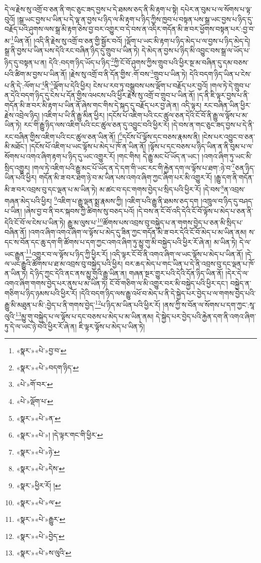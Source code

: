 དེ་ལ་རྗེས་སུ་འགྲོ་བ་ཅན་ནི་གང་ཅུང་ཟད་བྱས་པ་དེ་ཐམས་ཅད་ནི་མི་རྟག་པ་སྟེ། དཔེར་ན་བུམ་པ་ལ་སོགས་པ་ལྟ་བུའོ། །སྒྲ་ཡང་བྱས་པ་ཡིན་པ་དེ་ལྟ་ན་བྱས་པ་ཉིད་ལ་མི་རྟག་པ་ཉིད་ཀྱིས་ཁྱབ་པ་བསྟན་པས་སྒྲ་ཡང་བྱས་པ་ཉིད་དུ་བརྗོད་པའི་ཤུགས་ལས་སྒྲ་མི་རྟག་ཅེས་བྱ་བར་འགྱུར་བ་དེ་བས་ན་འདིར་གདོན་མི་ཟ་བར་ཕྱོགས་བསྟན་པར་:བྱ་བ་མ་\footnote{«སྣར་»«པེ་»བྱ་བ་}ཡིན་ནོ། །འདི་ནི་རྗེས་སུ་འགྲོ་བ་ཅན་གྱི་སྦྱོར་བའོ། །ལྡོག་པ་ཡང་མི་རྟག་པ་ཉིད་མེད་པ་ལ་བྱས་པ་ཉིད་མེད་དེ། སྒྲ་ནི་བྱས་པ་ཡིན་པས་དེའི་རང་བཞིན་ཉིད་དུ་གྲུབ་པ་ཡིན་ཏེ། དེ་མེད་ན་བྱས་པ་ཉིད་མི་འབྱུང་བས་སྒྲ་ལ་ཡོད་པ་ཉིད་དུ་བསྟན་པ་ན། དེའི་:བདག་ཉིད་ཡོད་པ་ཉིད་\footnote{«སྣར་»«པེ་»བདག་ཉིད་}ཀྱི་ངོ་བོ་ཤུགས་ཀྱིས་གྲུབ་པའི་ཕྱིར་སྔ་མ་བཞིན་དུ་དམ་བཅས་པའི་ཚིག་མ་བྱས་པ་ཡིན་ནོ། །རྗེས་སུ་འགྲོ་བ་ནི་དོན་གྱིས་:གོ་བས་\footnote{«པེ་»གོ་བར་}གྲུབ་པ་ཡིན་ཏེ། དེའི་བདག་ཉིད་ཡིན་པ་ངེས་པ་ནི་དེ་:ལོག་པ་\footnote{«པེ་»ལྡོག་པ་}ནི་\footnote{«སྣར་»«པེ་»ན་}ལྡོག་པ་དེའི་ཕྱིར། ངེས་པ་རབ་ཏུ་བསྒྲུབས་པས་ལྡོག་པ་བརྗོད་པར་བྱའོ། །གལ་ཏེ་དེ་གྲུབ་པ་ན་དེའི་བདག་ཉིད་དུ་ངེས་པ་དོན་གྱིས་འཕངས་པའི་ཕྱིར་རྗེས་སུ་འགྲོ་བ་གྲུབ་པ་ཡིན་ནོ། །ད་ནི་ཇི་ལྟར་བྱས་པ་ནི་གདོན་མི་ཟ་བར་མི་རྟག་པ་ཡིན་ནོ་ཞེས་གང་གིས་དེ་སྐད་དུ་བརྗོད་པར་བྱ་ཞེ་ན། འདི་ལྟར། རང་བཞིན་ཡིན་ཕྱིར་རྗེས་འབྲེལ་ཉིད། །འཇིག་པ་ཡི་ནི་རྒྱུ་མིན་ཕྱིར། །དངོས་པོ་འཇིག་པའི་ངང་ཚུལ་ཅན་དེའི་ངོ་བོ་ནི་རྒྱུ་ལ་ལྟོས་པ་མ་ཡིན་ཏེ། རང་གི་རྒྱུ་ཉིད་ལས་འཇིག་པའི་ངང་ཚུལ་ཅན་དུ་འབྱུང་བའི་ཕྱིར་རོ། །དེ་བས་ན་གང་ཅུང་ཟད་བྱས་པ་དེ་ནི་རང་བཞིན་གྱིས་འཇིག་པའི་ངང་ཚུལ་ཅན་ཡིན་ནོ། །\footnote{«སྣར་»«པེ་»། །དེ་ལྟར་གང་གི་ཕྱིར་}དངོས་པོ་ལྟོས་དང་བཅས་རྣམས་ནི། །ངེས་པར་འབྱུང་བ་ཅན་མི་མཐོང་། །དངོས་པོ་འཇིག་པ་ཡང་ལྟོས་པ་མེད་པ་ཁོ་ན་ཡིན་ནོ། །ལྟོས་པ་དང་བཅས་པ་ཉིད་ཡིན་ན་ནི་བུམ་པ་ལ་སོགས་པ་འགའ་ཞིག་རྟག་པ་ཉིད་དུ་ཡང་འགྱུར་རོ། །གང་གིས། དེ་རྒྱུ་མང་པོ་ཡོད་ན་ཡང་། །འགའ་ཞིག་ཏུ་ཡང་མི་སྲིད་འགྱུར། །གལ་ཏེ་འཇིག་པའི་རྒྱུ་མང་པོ་ཡོད་ན་དེ་དག་གི་ཡང་རང་གི་རྐྱེན་དག་ལ་ལྟོས་པ་ཐག་:ཉེ་བ་\footnote{«སྣར་»«པེ་»ཉེ་}ཅན་ཉིད་ཡིན་པའི་ཕྱིར། གདོན་མི་ཟ་བར་ཐག་ཉེ་བ་མ་ཡིན་པས་འགའ་ཞིག་ཀྱང་ཞིག་པར་མི་འགྱུར་རོ། །རྒྱུ་དག་ནི་གདོན་མི་ཟ་བར་འབྲས་བུ་དང་ལྡན་པ་མ་ཡིན་ཏེ། མ་ཚང་བ་དང་གགས་བྱེད་པ་སྲིད་པའི་ཕྱིར་རོ། །དེ་བས་\footnote{«སྣར་»«པེ་»དེས་}ན་འབྲས་གཞན་མེད་པའི་ཕྱིར། \footnote{«སྣར་»ཕྱིར་རོ། ། }འཇིག་པ་རྒྱུ་ལྡན་སྨྲ་རྣམས་ཀྱི། །འཇིག་པའི་རྒྱུ་ནི་ཐམས་ཅད་དག །འཁྲུལ་བ་ཉིད་དུ་བཤད་པ་ཡིན། །ཞེས་བྱ་བ་ནི་བར་སྐབས་ཀྱི་ཚིགས་སུ་བཅད་པའོ། །དེ་བས་ན་ངོ་བོ་འདི་དེའི་ངོ་བོ་ལྟོས་པ་མེད་པ་ཅན་ནི་དེའི་ངོ་བོ་ལ་ངེས་པ་ཡིན་ཏེ། རྒྱུ་མ་ལུས་པ་\footnote{«སྣར་»«པེ་»ལ་}ཚོགས་པས་འབྲས་བུ་བསྐྱེད་པ་ན་གགས་བྱེད་པ་ཅན་མི་སྲིད་པ་བཞིན་ནོ། །འགའ་ཞིག་འགའ་ཞིག་ལ་ལྟོས་པ་མེད་དུ་ཟིན་ཀྱང་གདོན་མི་ཟ་བར་དེའི་ངོ་བོ་མེད་པ་མ་ཡིན་ནམ། ས་དང་ས་བོན་དང་ཆུ་དག་གི་ཚོགས་པ་དག་ཀྱང་འགའ་ཞིག་ཏུ་མྱུ་གུ་མི་བསྐྱེད་པའི་ཕྱིར་རོ་ཞེ་ན། མ་ཡིན་ཏེ། དེ་ལ་ཡང་རྒྱུན་\footnote{«སྣར་»«པེ་»རྒྱུར་}འགྱུར་བ་ལ་ལྟོས་པ་ཉིད་ཀྱི་ཕྱིར་རོ། །འདི་ལྟར་ངོ་བོ་ནི་འགའ་ཞིག་ལ་ཡང་ལྟོས་པ་མེད་པ་ཡིན་ནོ། །དེ་ལ་ཡང་རྒྱུའི་ཚོགས་པ་ཐ་མ་འབྲས་བུ་བསྐྱེད་པའི་ཕྱིར། བར་ཆད་མེད་པ་གང་ཡིན་པ་དེ་ནི་འབྲས་བུ་དང་ལྡན་པ་ཁོ་ན་ཡིན་ཏེ། དེ་ཉིད་ཀྱང་དེའི་ནང་ནས་མྱུ་གུའི་རྒྱུ་ཡིན་ན། གཞན་སྔར་གྱུར་པའི་དེའི་དོན་ཉིད་ཡིན་ནོ། །དེར་དེ་ལ་འགའ་ཞིག་གགས་བྱེད་པར་ནུས་པ་མ་ཡིན་ཏེ། ངོ་བོ་གཅིག་ལ་མི་འགྱུར་བར་མི་བསྐྱེད་པའི་ཕྱིར་དང་། བསྐྱེད་ན་གཅིག་པ་ཉིད་ཉམས་པའི་ཕྱིར་རོ། །དེའི་བདག་ཉིད་ལས་རྒྱུ་འཕོ་བ་མེད་པ་ནི་དེ་སྐྱེད་པར་བྱེད་པ་ལ་གགས་བྱེད་པའི་རྒྱུ་མི་མཐུན་པ་མི་:བྱེད་པ་ནི་གགས་བྱེད་\footnote{«སྣར་»«པེ་»བྱེད་}པ་ཉིད་མ་ཡིན་པའི་ཕྱིར་རོ། །ནས་ཀྱི་ས་བོན་ལ་སོགས་པ་དག་ཀྱང་:སཱ་ལུའི་\footnote{«སྣར་»«པེ་»ས་ལུའི་}མྱུ་གུ་བསྐྱེད་པ་ལ་ལྟོས་པ་དང་བཅས་པ་མེད་པ་མ་ཡིན་ནམ། དེ་སྐྱེད་པར་བྱེད་པའི་རྐྱེན་དག་ནི་འགའ་ཞིག་ཏུ་དེ་ལ་ཡང་ཉེ་བའི་ཕྱིར་རོ་ཞེ་ན། ཇི་ལྟར་ལྟོས་པ་མེད་པ་ཡིན་ཏེ། 